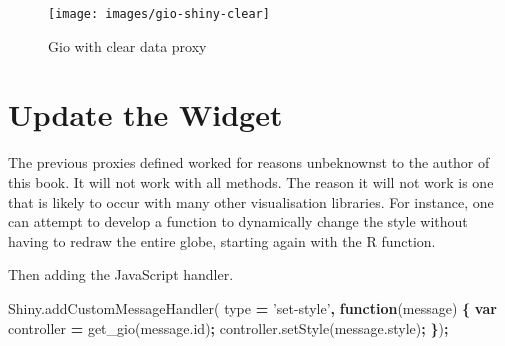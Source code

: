 \documentclass[10pt,]{krantz}
\makeatletter
\newenvironment{Shaded}{\begin{snugshade}}{\end{snugshade}}
\newcommand{\AttributeTok}[1]{\textcolor[rgb]{0.61,0.61,0.61}{#1}}
\newcommand{\CommentTok}[1]{\textcolor[rgb]{0.37,0.37,0.37}{\textit{#1}}}
\newcommand{\ControlFlowTok}[1]{\textcolor[rgb]{0.27,0.27,0.27}{\textbf{#1}}}
\newcommand{\DataTypeTok}[1]{\textcolor[rgb]{0.27,0.27,0.27}{#1}}
\newcommand{\KeywordTok}[1]{\textcolor[rgb]{0.27,0.27,0.27}{\textbf{#1}}}
\newcommand{\NormalTok}[1]{#1}
\newcommand{\OperatorTok}[1]{\textcolor[rgb]{0.43,0.43,0.43}{\textbf{#1}}}
\newcommand{\StringTok}[1]{\textcolor[rgb]{0.5,0.5,0.5}{#1}}
\newcommand{\VariableTok}[1]{\textcolor[rgb]{0,0,0}{#1}}
\newenvironment{kframe}{%
\medskip{}
\setlength{\fboxsep}{.8em}
 \def\at@end@of@kframe{}%
 \ifinner\ifhmode%
  \def\at@end@of@kframe{\end{minipage}}%
  \begin{minipage}{\columnwidth}%
 \fi\fi%
 \def\FrameCommand##1{\hskip\@totalleftmargin \hskip-\fboxsep
 \colorbox{shadecolor}{##1}\hskip-\fboxsep
     \hskip-\linewidth \hskip-\@totalleftmargin \hskip\columnwidth}%
 \MakeFramed {\advance\hsize-\width
   \@totalleftmargin\z@ \linewidth\hsize
   \@setminipage}}%
 {\par\unskip\endMakeFramed%
 \at@end@of@kframe}
\renewenvironment{Shaded}{\begin{kframe}}{\end{kframe}}
\makeatother
\begin{document}
\begin{figure}[H]

{\centering \texttt{[image: images/gio-shiny-clear]} 

}

\caption{Gio with clear data proxy}\label{fig:giod-shiny-clear-data}
\end{figure}

\hypertarget{shiny-widgets-update}{%
\section{Update the Widget}\label{shiny-widgets-update}}

The previous proxies defined worked for reasons unbeknownst to the author of this book. It will not work with all methods. The reason it will not work is one that is likely to occur with many other visualisation libraries. For instance, one can attempt to develop a function to dynamically change the style without having to redraw the entire globe, starting again with the R function.

\begin{Shaded}
\end{Shaded}

Then adding the JavaScript handler.

\begin{Shaded}
\begin{Highlighting}[]
\VariableTok{Shiny}\NormalTok{.}\AttributeTok{addCustomMessageHandler}\NormalTok{(}
\NormalTok{  type }\OperatorTok{=} \StringTok{'set-style'}\OperatorTok{,} \KeywordTok{function}\NormalTok{(message) }\OperatorTok{\{}
    \KeywordTok{var}\NormalTok{ controller }\OperatorTok{=} \AttributeTok{get_gio}\NormalTok{(}\VariableTok{message}\NormalTok{.}\AttributeTok{id}\NormalTok{)}\OperatorTok{;}
    \VariableTok{controller}\NormalTok{.}\AttributeTok{setStyle}\NormalTok{(}\VariableTok{message}\NormalTok{.}\AttributeTok{style}\NormalTok{)}\OperatorTok{;}
\OperatorTok{\}}\NormalTok{)}\OperatorTok{;}
\end{Highlighting}
\end{Shaded}
\end{document}
